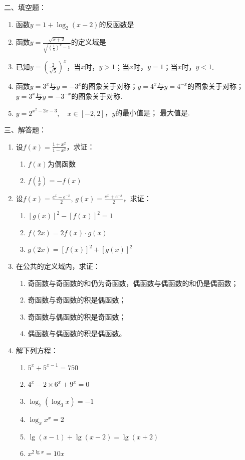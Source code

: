 二、填空题：
\begin{enumerate}
    \item 函数$y=1+\log_2 (x-2)$的反函数是\blank 
    \item 函数$y=\frac{\sqrt{x+2}}{\sqrt{\left(\frac{1}{5}\right)^x-1}}$的定义域是\blank
    \item 已知$y=\left(\frac{2}{\sqrt{5}}\right)^x$，当$x$\blank 时，$y>1$；当$x$\blank 时，$y=1$；当$x$\blank 时，$y<1$.
    \item 函数$y=3^x$与$y=-3^x$的图象关于\blank 对称；$y=4^x$与$y=4^{-x}$的图象关于\blank 对称；$y=3^x$与$y=-3^{-x}$的图象关于\blank 对称.
    \item $y=2^{x^2-2x-3},\quad x\in [-2,2]$，$y$的最小值是\blank； 最大值是\blank.
\end{enumerate}

三、解答题：
\begin{enumerate}
    \item 设$f(x)=\frac{1+x^2}{1-x^2}$，求证：
\begin{multicols}{2}
\begin{enumerate}[(1)]
    \item $f(x)$为偶函数
    \item $f\left(\frac{1}{x}\right)=-f(x)$
\end{enumerate}
\end{multicols}

\item 设$f(x)=\frac{e^x-e^{-x}}{2}$, $g(x)=\frac{e^x+e^{-x}}{2}$，求证：
\begin{enumerate}[(1)]
    \item $[g(x)]^2-[f(x)]^2=1$
    \item $f(2x)=2f(x)\cdot g(x)$
    \item $g(2x)=[f(x)]^2+[g(x)]^2$
\end{enumerate}

\item 在公共的定义域内，求证：
\begin{enumerate}[(1)]
\item 奇函数与奇函数的和仍为奇函数，偶函数与偶函数的和仍是偶函数；
\item 奇函数与奇函数的积是偶函数；
\item 奇函数与偶函数的积是奇函数；
\item 偶函数与偶函数的积是偶函数。
\end{enumerate}

\item 解下列方程：
\begin{multicols}{2}
\begin{enumerate}[(1)]
    \item $5^x+5^{x-1}=750$
    \item $4^x-2\times 6^x+9^x=0$
    \item $\log_7(\log_3 x)=-1$
    \item $\log_x x^x=2$
    \item $\lg(x-1)+\lg(x-2)=\lg(x+2)$
    \item $x^{2\lg x}=10x$
\end{enumerate}
\end{multicols}
\end{enumerate}


